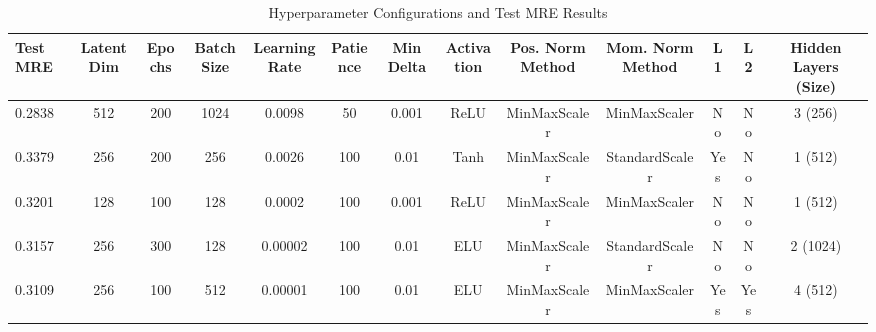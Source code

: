 \documentclass{article}
\begin{document}
\begin{table}[ht]
\centering
\caption{Hyperparameter Configurations and Test MRE Results}
\begin{adjustbox}{max width=\textwidth}
\begin{tabular}{@{}lcccccccccccc@{}}
\toprule
\textbf{Test MRE} & \textbf{Latent Dim} & \textbf{Epochs} & \textbf{Batch Size} & \textbf{Learning Rate} & \textbf{Patience} & \textbf{Min Delta} & \textbf{Activation} & \textbf{Pos. Norm Method} & \textbf{Mom. Norm Method} & \textbf{L1} & \textbf{L2} & \textbf{Hidden Layers (Size)} \\ \midrule
0.2838           & 512                 & 200             & 1024                & 0.0098                 & 50                & 0.001              & ReLU               & MinMaxScaler             & MinMaxScaler            & No          & No          & 3 (256)                      \\
0.3379           & 256                 & 200             & 256                 & 0.0026                 & 100               & 0.01               & Tanh               & MinMaxScaler             & StandardScaler          & Yes         & No          & 1 (512)                      \\
0.3201           & 128                 & 100             & 128                 & 0.0002                 & 100               & 0.001              & ReLU               & MinMaxScaler             & MinMaxScaler            & No          & No          & 1 (512)                      \\
0.3157           & 256                 & 300             & 128                 & 0.00002                & 100               & 0.01               & ELU                & MinMaxScaler             & StandardScaler          & No          & No          & 2 (1024)                     \\
0.3109           & 256                 & 100             & 512                 & 0.00001                & 100               & 0.01               & ELU                & MinMaxScaler             & MinMaxScaler            & Yes         & Yes         & 4 (512)                      \\ \bottomrule
\end{tabular}
\end{adjustbox}
\label{tab:hyperparameters}
\end{table}
\end{document}
